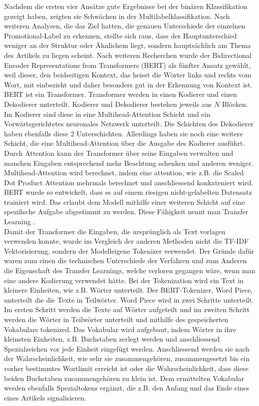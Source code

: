 Nachdem die ersten vier Ansätze gute Ergebnisse bei der binären Klassifikation gezeigt haben, zeigten sie Schwächen in der Multilabelklassifikation. Nach weiteren Analysen, die das Ziel hatten, die genauen Unterschiede der einzelnen Promotional-Label zu erkennen, stellte sich raus, dass der Hauptunterschied weniger an der Struktur oder Ähnlichem liegt, sondern hauptsächlich am Thema des Artikels zu liegen scheint. Nach weiteren Recherchen wurde der Bidirectional Encoder Representations from Transformers (BERT) als fünfter Ansatz gewählt, weil dieser, den beidseitigen Kontext, das heisst die Wörter links und rechts vom Wort, mit einbezieht und daher besonders gut in der Erkennung von Kontext ist.
\\
BERT ist ein Transformer. Transformer werden in einen Kodierer und einen Dekodierer unterteilt. Kodierer und Dekodierer bestehen jeweils aus $N$ Blöcken. Im Kodierer sind diese in eine Multihead-Attention Schicht und ein Vorwärtsgerichtetes neuronales Netzwerk unterteilt. Die Schichten des Dekodierer haben ebenfalls diese 2 Unterschichten. Allerdings haben sie noch eine weitere Schicht, die eine Multihead-Attention über die Ausgabe des Kodierer ausführt. Durch Attention kann der Transformer über seine Eingaben verwalten und manchen Eingaben entsprechend mehr Beachtung schenken und anderen weniger. Multihead-Attention wird berechnet, indem eine attention, wie z.B. die Scaled Dot Product Attention  \cite{Vaswani2017} mehrmals berechnet und anschliessend konkateniert wird. 
BERT wurde so entwickelt, dass es auf einem riesigen nicht-gelabelten Datensatz trainiert wird. Das erlaubt dem Modell mithilfe einer weiteren Schicht auf eine spezifische Aufgabe abgestimmt zu werden. Diese Fähigkeit nennt man Transfer Learning \cite{Devlin2018}. \\
Damit der Transformer die Eingaben, die ursprünglich als Text vorlagen verwenden konnte, wurde im Vergleich der anderen Methoden nicht die TF-IDF Vektorisierung, sondern der Modelleigene Tokenizer verwendet. Der Gründe dafür waren zum einen die technischen Unterschiede der Verfahren und zum Anderen die Eigenschaft des Transfer Learnings, welche verloren gegangen wäre, wenn man eine andere Kodierung verwendet hätte. Bei der Tokenization wird ein Text in kleinere Einheiten, wie z.B. Wörter unterteilt. Der BERT-Tokenizer, Word Piece, unterteilt die die Texte in Teilwörter. Word Piece wird in zwei Schritte unterteilt. Im ersten Schritt werden die Texte auf Wörter aufgeteilt und im zweiten Schritt werden die Wörter in Teilwörter unterteilt und mithilfe des gespeicherten Vokabulars tokenized. Das Vokabular wird aufgebaut, indem  Wörter in ihre kleinsten Einheiten, z.B. Buchstaben zerlegt werden und anschliessend Spezialzeichen vor jede Einheit eingefügt werden. Anschliessend werden sie nach der Wahrscheinlichkeit, wie sehr sie zusammengehören, zusammengesetzt bis ein vorher bestimmtes Wortlimit erreicht ist oder die Wahrscheinlichkeit, dass diese beiden Buchstaben zusammengehören zu klein ist. Dem ermittelten Vokabular werden ebenfalls Spezialtokens ergänzt, die z.B. den Anfang und das Ende eines eines Artikels signalisieren. \\
